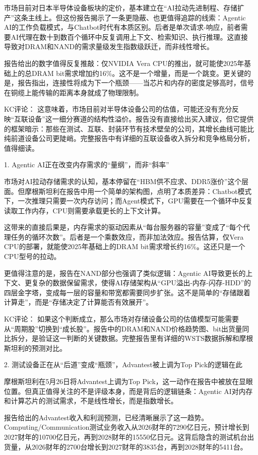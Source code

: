 \documentclass[11pt]{ctexart}
\begin{document}
市场目前对日本半导体设备板块的定价，基本建立在“AI拉动先进制程、存储扩产”这条主线上。但这份报告揭示了一条更隐蔽、也更值得追踪的线索：Agentic AI的工作负载模式，与Chatbot时代有本质区别。后者是单次请求-响应，前者需要AI代理在数十到数百个循环中反复调用上下文、检索知识、执行推理。这直接导致对DRAM和NAND的需求量级发生指数级跃迁，而非线性增长。

报告给出的数字值得反复推敲：仅NVIDIA Vera CPU的推出，就可能使2025年基础上的总DRAM bit需求增加约16\%。这不是一个增量，而是一个跳变。更关键的是，报告指出，连接性将成为下一个瓶颈——当芯片和内存的密度足够高时，信号在铜缆上能传输的距离本身就成了物理限制。

KC评论： 这意味着，市场目前对半导体设备公司的估值，可能还没有充分反映“互联设备”这一细分赛道的结构性溢价。报告没有直接给出买入建议，但它提供的框架暗示：那些在测试、互联、封装环节有技术壁垒的公司，其增长曲线可能比纯前道设备公司更陡峭。完整报告中有详细的互联设备收入拆分和竞争格局分析，值得细读。

1. Agentic AI正在改变内存需求的“量纲”，而非“斜率”

市场对AI拉动存储需求的认知，基本停留在“HBM供不应求、DDR5涨价”这个层面。但摩根斯坦利在报告中用一个简单的架构图，点明了本质差异：Chatbot模式下，一次推理只需要一次内存访问；而Agent模式下，GPU需要在一个循环中反复读取工作内存，CPU则需要承载更长的上下文计算。

这带来的直接后果是，内存需求的驱动因素从“每台服务器的容量”变成了“每个代理任务的循环次数”。后者是一个乘数效应，而非加法效应。报告估算，仅Vera CPU的部署，就能使2025年基础上的DRAM bit需求增长约16\%。这还只是一个CPU型号的拉动。

更值得注意的是，报告在NAND部分也强调了类似逻辑：Agentic AI导致更长的上下文、更复杂的数据保留需求，使得AI存储架构从“GPU溢出-内存-闪存-HDD”的四层金字塔，变成每一层的容量和带宽都需要同步扩张。这不是简单的“存储跟着计算走”，而是“存储决定了计算能否有效展开”。

KC评论： 如果这个判断成立，那么市场对存储设备公司的估值模型可能需要从“周期股”切换到“成长股”。报告中的DRAM和NAND价格趋势图、bit出货量同比拆分，是验证这一判断的关键数据。完整报告里有详细的WSTS数据拆解和摩根斯坦利的预测对比。

2. 测试设备正在从“后道”变成“瓶颈”，Advantest被上调为Top Pick的逻辑在此

摩根斯坦利在5月26日将Advantest上调为Top Pick，这一动作在报告中被放在显眼位置。但真正值得关注的不是评级本身，而是背后的逻辑链条：Agentic AI对内存和计算芯片的测试需求，不是线性增长，而是指数增长。

报告给出的Advantest收入和利润预测，已经清晰展示了这一趋势。Computing/Communication测试业务收入从2026财年的7290亿日元，预计增长到2027财年的10700亿日元，再到2028财年的15550亿日元。这背后隐含的测试机台出货量，从2026财年的2700台增长到2027财年的3835台，再到2028财年的5411台。
\end{document}
